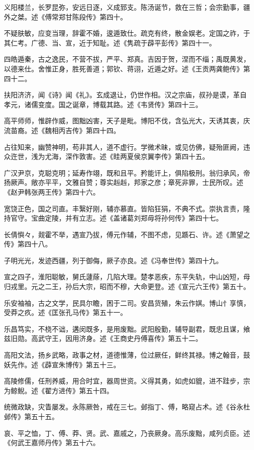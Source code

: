 \documentclass[]{article}
\begin{document}
义阳楼兰，长罗昆弥，安远日逐，义成郅支。陈汤诞节，救在三哲；会宗勤事，疆外之桀。述《傅常郑甘陈段传》第四十。

不疑肤敏，应变当理，辞霍不婚，逡遁致仕。疏克有终，散金娱老。定国之祚，于其仁考。广德、当、宣，近于知耻。述《隽疏于薜平彭传》第四十一。

四皓遁秦，古之逸民，不营不拔，严平、郑真。吉因于贺，涅而不缁；禹既黄发，以德来仕。舍惟正身，胜死善道；郭钦、蒋诩，近遁之好。述《王贡两龚鲍传》第四十二。

扶阳济济，闻《诗》闻《礼》。玄成退让，仍世作相。汉之宗庙，叔孙是谟，革自孝元，诸儒变度。国之诞章，博载其路。述《韦贤传》第四十三。

高平师师，惟辟作威，图黜凶害，天子是毗。博阳不伐，含弘光大，天诱其衷，庆流苗裔。述《魏相丙吉传》第四十四。

占往知来，幽赞神明，苟非其人，道不虚行。学微术昧，或见仿佛，疑殆匪阙，违众迕世，浅为尤海，深作敦害。述《眭两夏侯京翼李传》第四十五。

广汉尹京，克聪克明；延寿作翊，既和且平。矜能讦上，俱陷极刑。翁归承风，帝扬厥声。敞亦平平，文雅自赞；尊实赳赳，邦家之彦；章死非罪，士民所叹。述《赵尹韩张两王传》第四十六。

宽饶正色，国之司直。丰繄好刚，辅亦慕直。皆陷狂狷，不典不式。崇执言责，隆持官守。宝曲定陵，并有立志。述《盖诸葛刘郑毋将孙何传》第四十七。

长倩懙々，觌霍不举，遇宣乃拔，傅元作辅，不图不虑，见踬石、许。述《萧望之传》第四十八。

子明光光，发迹西疆，列于御侮，厥子亦良。述《冯奉世传》第四十九。

宣之四子，淮阳聪敏，舅氏蘧蒢，几陷大理。楚孝恶疾，东平失轨，中山凶短，母归戎里。元之二王，孙后大宗，昭而不穆，大命更登。述《宣元六王传》第五十。

乐安袖袖，古之文学，民具尔瞻，困于二司。安昌货殖，朱云作娸。博山忄享慎，受莽之疚。述《匡张孔马传》第五十一。

乐昌笃实，不桡不诎，遘闵既多，是用废黜。武阳殷勤，辅导副君，既忠且谋，飨兹旧勋。高武守王，因用济身。述《王商史丹傅喜传》第五十二。

高阳文法，扬乡武略，政事之材，道德惟薄，位过厥任，鲜终其禄。博之翰音，鼓妖先作。述《薜宣朱博传》第五十三。

高陵修儒，任刑养威，用合时宜，器周世资。义得其勇，如虎如貔，进不跬步，宗为鲸鲵。述《翟方进传》第五十四。

统微政缺，灾眚屡发。永陈厥咎，戒在三七。邺指丁、傅，略窥占术。述《谷永杜邺传》第五十五。

哀、平之恤，丁、傅、莽、贤。武、嘉戚之，乃丧厥身。高乐废黜，咸列贞臣。述《何武王嘉师丹传》第五十六。
\end{document}
